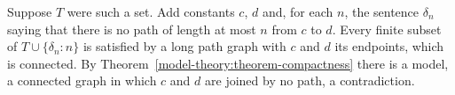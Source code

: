 \begin{solution}
Suppose $T$ were such a set. Add constants $c$, $d$ and, for each $n$, the sentence $\delta_n$ saying that there is no path of length at most $n$ from $c$ to
$d$. Every finite subset of $T \cup \{\delta_n : n\}$ is satisfied by a long path graph with $c$ and $d$ its endpoints, which is connected. By
Theorem~\ref{model-theory:theorem-compactness} there is a model, a connected graph in which $c$ and $d$ are joined by no path, a contradiction.
\end{solution}
